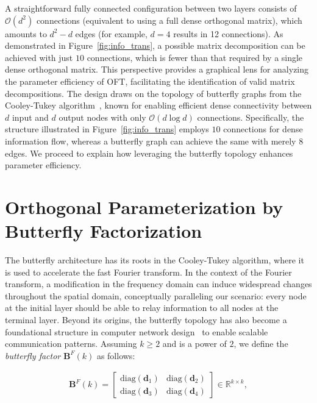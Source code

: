 A straightforward fully connected configuration between two layers consists of $\mathcal{O}(d^2)$ connections (equivalent to using a full dense orthogonal matrix), which amounts to $d^2-d$ edges (for example, $d=4$ results in 12 connections). As demonstrated in Figure~\ref{fig:info_trans}, a possible matrix decomposition can be achieved with just $10$ connections, which is fewer than that required by a single dense orthogonal matrix. This perspective provides a graphical lens for analyzing the parameter efficiency of OFT, facilitating the identification of valid matrix decompositions. The design draws on the topology of butterfly graphs from the Cooley-Tukey algorithm~\cite{cooley1965algorithm}, known for enabling efficient dense connectivity between $d$ input and $d$ output nodes with only $\mathcal{O}(d\log d)$ connections. Specifically, the structure illustrated in Figure~\ref{fig:info_trans} employs $10$ connections for dense information flow, whereas a butterfly graph can achieve the same with merely $8$ edges. We proceed to explain how leveraging the butterfly topology enhances parameter efficiency.

\section{Orthogonal Parameterization by Butterfly Factorization}

The butterfly architecture has its roots in the Cooley-Tukey algorithm, where it is used to accelerate the fast Fourier transform. In the context of the Fourier transform, a modification in the frequency domain can induce widespread changes throughout the spatial domain, conceptually paralleling our scenario: every node at the initial layer should be able to relay information to all nodes at the terminal layer. Beyond its origins, the butterfly topology has also become a foundational structure in computer network design~\cite{solihin2015fundamentals,li2011linear} to enable scalable communication patterns. Assuming $k \geq 2$ and is a power of $2$, we define the \emph{butterfly factor} $\bm{B}^F(k)$ as follows:

\begin{equation}\label{eq:but_factor}
\begin{aligned}
    \bm{B}^F(k)=\begin{bmatrix}
    \text{diag}(\bm{d}_1) & \text{diag}(\bm{d}_2) \\
    \text{diag}(\bm{d}_3) & \text{diag}(\bm{d}_4)
    \end{bmatrix}\in\mathbb{R}^{k\times k},
\end{aligned}
\end{equation}

